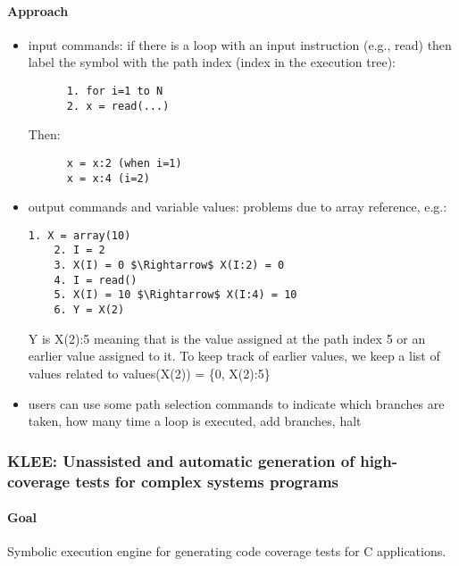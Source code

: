   \paragraph{Approach}

    \begin{itemize}
      \item input commands: if there is a loop with an input instruction (e.g., read) then label the symbol with the path index (index in the execution tree):

        \begin{lstlisting}
      1. for i=1 to N 
      2. x = read(...)
        \end{lstlisting}
      Then:
      \begin{lstlisting}
      x = x:2 (when i=1)
      x = x:4 (i=2)
        \end{lstlisting}

        \item output commands and variable values: problems due to array reference, e.g.:
      \begin{lstlisting}[mathescape=true]
    1. X = array(10)
    2. I = 2
    3. X(I) = 0 $\Rightarrow$ X(I:2) = 0
    4. I = read()
    5. X(I) = 10 $\Rightarrow$ X(I:4) = 10
    6. Y = X(2)
      \end{lstlisting}
      Y is X(2):5 meaning that is the value assigned at the path index 5 or an earlier value assigned to it. To keep track of earlier values, we keep a list of values related to values(X(2)) = \{0, X(2):5\}

      \item users can use some path selection commands to indicate which branches are taken, how many time a loop is executed, add branches, halt

    \end{itemize}

\subsubsection{\cite{KLEE-OSDI08} KLEE: Unassisted and automatic generation of high-coverage tests for complex systems programs} 

\paragraph{Goal}

Symbolic execution engine for generating code coverage tests for C applications.

